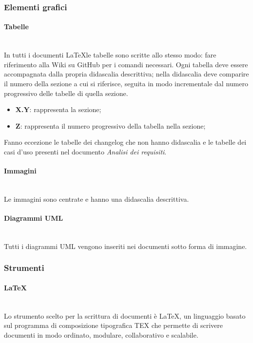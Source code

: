 		\subsubsection{Elementi grafici}
		\paragraph{Tabelle} \mbox{}\\
		In tutti i documenti \LaTeX le tabelle sono scritte allo stesso modo: fare riferimento alla Wiki su GitHub per i comandi necessari.\newline 
		Ogni tabella deve essere accompagnata dalla propria didascalia descrittiva; nella didascalia deve comparire il numero della sezione a cui si riferisce, seguita in modo incrementale dal numero progressivo delle tabelle di quella sezione.
		\begin{itemize}
			\item \textbf{{X.Y}}: rappresenta la sezione;
			\item \textbf{{Z}}: rappresenta il numero progressivo della tabella nella sezione;
		\end{itemize}
		Fanno eccezione le tabelle dei changelog che non hanno didascalia e le tabelle dei casi d’uso presenti nel documento \textit{Analisi dei requisiti}.
		\paragraph{Immagini} \mbox{}\\
		Le immagini sono centrate e hanno una didascalia descrittiva. 
		\paragraph{Diagrammi UML} \mbox{}\\
		Tutti i diagrammi UML vengono inseriti nei documenti sotto forma di immagine.
	\subsubsection{Strumenti}
		\paragraph{\LaTeX} \mbox{}\\
		Lo strumento scelto per la scrittura di documenti è \LaTeX, un linguaggio basato sul programma di composizione tipografica TEX che permette di scrivere documenti in modo ordinato, modulare, collaborativo e scalabile.
